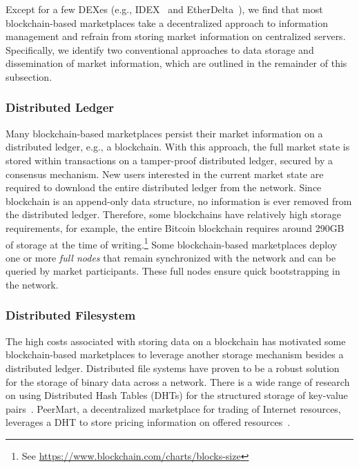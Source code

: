 Except for a few DEXes (e.g., IDEX~\cite{idex} and EtherDelta~\cite{etherdelta}), we find that most blockchain-based marketplaces take a decentralized approach to information management and refrain from storing market information on centralized servers.
Specifically, we identify two conventional approaches to data storage and dissemination of market information, which are outlined in the remainder of this subsection.

\subsubsection{Distributed Ledger}
Many blockchain-based marketplaces persist their market information on a distributed ledger, e.g., a blockchain.
With this approach, the full market state is stored within transactions on a tamper-proof distributed ledger, secured by a consensus mechanism.
New users interested in the current market state are required to download the entire distributed ledger from the network.
Since blockchain is an append-only data structure, no information is ever removed from the distributed ledger.
Therefore, some blockchains have relatively high storage requirements, for example, the entire Bitcoin blockchain requires around 290GB of storage at the time of writing.\footnote{See \url{https://www.blockchain.com/charts/blocks-size}}
Some blockchain-based marketplaces deploy one or more \emph{full nodes} that remain synchronized with the network and can be queried by market participants.
These full nodes ensure quick bootstrapping in the network.

\subsubsection{Distributed Filesystem}
The high costs associated with storing data on a blockchain has motivated some blockchain-based marketplaces to leverage another storage mechanism besides a distributed ledger.
Distributed file systems have proven to be a robust solution for the storage of binary data across a network.
There is a wide range of research on using Distributed Hash Tables (DHTs) for the structured storage of key-value pairs~\cite{maymounkov2002kademlia}.
PeerMart, a decentralized marketplace for trading of Internet resources, leverages a DHT to store pricing information on offered resources~\cite{hausheer2006peermart}.

